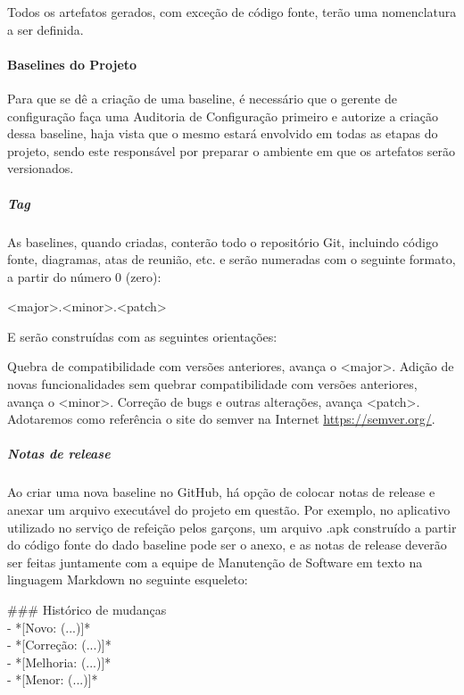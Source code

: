  Todos os artefatos gerados, com exceção de código fonte, terão uma nomenclatura a ser definida.



\paragraph{Baselines do Projeto}

Para que se dê a criação de uma baseline, é necessário que o gerente de configuração faça uma Auditoria de Configuração primeiro e autorize a criação dessa baseline, haja vista que o mesmo estará envolvido em todas as etapas do projeto, sendo este responsável por preparar o ambiente em que os artefatos serão versionados.

\subparagraph{Tag}

As baselines, quando criadas, conterão todo o repositório Git, incluindo código fonte, diagramas, atas de reunião, etc. e serão numeradas com o seguinte formato, a partir do número 0 (zero):

\begin{myprop}
<major>.<minor>.<patch>
\end{myprop}

E serão construídas com as seguintes orientações:

Quebra de compatibilidade com versões anteriores, avança o <major>.
Adição de novas funcionalidades sem quebrar compatibilidade com versões anteriores, avança o <minor>.
Correção de bugs e outras alterações, avança <patch>.
Adotaremos como referência o site do semver na Internet \url{https://semver.org/}.

\subparagraph{Notas de release}

Ao criar uma nova baseline no GitHub, há opção de colocar notas de release e anexar um arquivo executável do projeto em questão. Por exemplo, no aplicativo utilizado no serviço de refeição pelos garçons, um arquivo .apk construído a partir do código fonte do dado baseline pode ser o anexo, e as notas de release deverão ser feitas juntamente com a equipe de Manutenção de Software em texto na linguagem Markdown no seguinte esqueleto:

\begin{myprop}
\#\#\# Histórico de mudanças \\
- *[Novo: (...)]* \\
- *[Correção: (...)]* \\
- *[Melhoria: (...)]* \\
- *[Menor: (...)]* 
\end{myprop}

